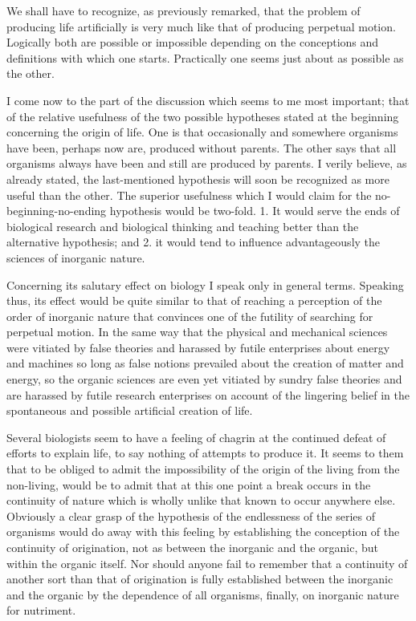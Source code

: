 \documentclass[a4paper, 11pt, oneside, polutonikogreek, english]{article}
\begin{document}
We shall have to recognize, as previously remarked, that the problem of producing life artificially is very much like that of producing perpetual motion. Logically both are possible or impossible depending on the conceptions and definitions with which one starts. Practically one seems just about as possible as the other.

I come now to the part of the discussion which seems to me most important; that of the relative usefulness of the two possible hypotheses stated at the beginning concerning the origin of life. One is that occasionally and somewhere organisms have been, perhaps now are, produced without parents. The other says that all organisms always have been and still are produced by parents. I verily believe, as already stated, the last-mentioned hypothesis will soon be recognized as more useful than the other. The superior usefulness which I would claim for the no-beginning-no-ending hypothesis would be two-fold. 1. It would serve the ends of biological research and biological thinking and teaching better than the alternative hypothesis; and 2. it would tend to influence advantageously the sciences of inorganic nature.

Concerning its salutary effect on biology I speak only in general terms. Speaking thus, its effect would be quite similar to that of reaching a perception of the order of inorganic nature that convinces one of the futility of searching for perpetual motion. In the same way that the physical and mechanical sciences were vitiated by false theories and harassed by futile enterprises about energy and machines so long as false notions prevailed about the creation of matter and energy, so the organic sciences are even yet vitiated by sundry false theories and are harassed by futile research enterprises on account of the lingering belief in the spontaneous and possible artificial creation of life.

Several biologists seem to have a feeling of chagrin at the continued defeat of efforts to explain life, to say nothing of attempts to produce it. It seems to them that to be obliged to admit the impossibility of the origin of the living from the non-living, would be to admit that at this one point a break occurs in the continuity of nature which is wholly unlike that known to occur anywhere else. Obviously a clear grasp of the hypothesis of the endlessness of the series of organisms would do away with this feeling by establishing the conception of the continuity of origination, not as between the inorganic and the organic, but within the organic itself. Nor should anyone fail to remember that a continuity of another sort than that of origination is fully established between the inorganic and the organic by the dependence of all organisms, finally, on inorganic nature for nutriment.
\end{document}
